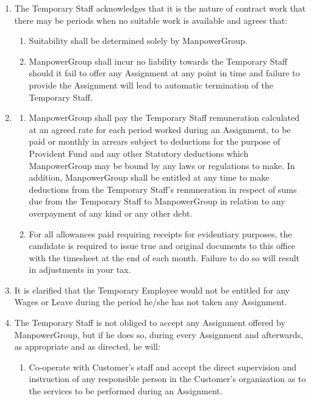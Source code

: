 \documentclass[10pt,a4paper]{article}
\begin{document}
\begin{enumerate}[leftmargin=*, label=\textbf{\arabic*.}, itemsep=4pt]
\item The Temporary Staff acknowledges that it is the nature of contract work that there may be periods
when no suitable work is available and agrees that:
\begin{enumerate}[label=\textbf{(\alph*)}, itemsep=3pt, topsep=2pt]
  \item Suitability shall be determined solely by ManpowerGroup.
  \item ManpowerGroup shall incur no liability towards the Temporary Staff should it fail to offer any
        Assignment at any point in time and failure to provide the Assignment will lead to automatic
        termination of the Temporary Staff.
\end{enumerate}

\item \begin{enumerate}[label=\textbf{(\alph*)}, itemsep=3pt, topsep=2pt]
  \item  ManpowerGroup shall pay the Temporary Staff remuneration calculated at an agreed rate for
each period worked during an Assignment, to be paid or monthly in arrears subject to
deductions for the purpose of Provident Fund and any other Statutory deductions which
ManpowerGroup may be bound by any laws or regulations to make. In addition,
ManpowerGroup shall be entitled at any time to make deductions from the Temporary Staff's
remuneration in respect of sums due from the Temporary Staff to ManpowerGroup in relation to
any overpayment of any kind or any other debt.

  \item  For all allowances paid requiring receipts for evidentiary purposes, the candidate is required to
issue true and original documents to this office with the timesheet at the end of each month.
Failure to do so will result in adjustments in your tax.

\end{enumerate}

\item It is clarified that the Temporary Employee would not be entitled for any Wages or Leave during
the period he/she has not taken any Assignment.

\item The Temporary Staff is not obliged to accept any Assignment offered by ManpowerGroup, but if he
does so, during every Assignment and afterwards, as appropriate and as directed, he will:
\begin{enumerate}[label=\textbf{(\alph*)}, itemsep=3pt, topsep=2pt]
  \item Co-operate with Customer's staff and accept the direct supervision and instruction of any
        responsible person in the Customer's organization as to the services to be performed during
        an Assignment.
\end{enumerate}

\end{enumerate}
\end{document}
